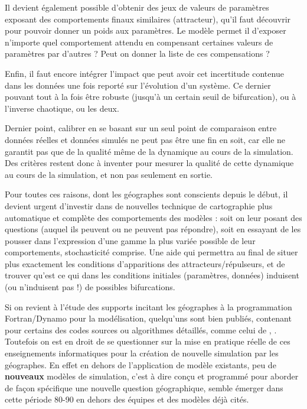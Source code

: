 Il devient également possible d'obtenir des jeux de valeurs de paramètres exposant des comportements finaux similaires (attracteur), qu'il faut découvrir pour pouvoir donner un poids aux paramètres. Le modèle permet il d'exposer n'importe quel comportement attendu en compensant certaines valeurs de paramètres par d'autres ? Peut on donner la liste de ces compensations ?

Enfin, il faut encore intégrer l'impact que peut avoir cet incertitude contenue dans les données une fois reporté sur l'évolution d'un système. Ce dernier pouvant tout à la fois être robuste (jusqu'à un certain seuil de bifurcation), ou à l'inverse chaotique, ou les deux.

Dernier point, calibrer en se basant sur un seul point de comparaison entre données réelles et données simulés ne peut pas être une fin en soit, car elle ne garantit pas que de la qualité même de la dynamique au cours de la simulation. Des critères restent donc à inventer pour mesurer la qualité de cette dynamique au cours de la simulation, et non pas seulement en sortie.

Pour toutes ces raisons, dont les géographes sont conscients depuis le début, il devient urgent d'investir dans de nouvelles technique de cartographie plus automatique et complète des comportements des modèles : soit on leur posant des questions (auquel ils peuvent ou ne peuvent pas répondre), soit en essayant de les pousser dans l'expression d'une gamme la plus variée possible de leur comportements, stochasticité comprise. Une aide qui permettra au final de situer plus exactement les conditions d'apparitions des attracteurs/répulseurs, et de trouver qu'est ce qui dans les conditions initiales (paramètres, données) induisent (ou n'induisent pas !) de possibles bifurcations.

Si on revient à l'étude des supports incitant les géographes à la programmation Fortran/Dynamo pour la modélisation, quelqu'uns sont bien publiés, contenant pour certains des codes sources ou algorithmes détaillés, comme celui de \textcite{Guermond1984}, \textcite{Dauphine1987}. Toutefois on est en droit de se questionner sur la mise en pratique réelle de ces enseignements informatiques pour la création de nouvelle simulation par les géographes. En effet en dehors de l'application de modèle existants, peu de \textbf{nouveaux} modèles de simulation, c'est à dire conçu et programmé pour aborder de façon spécifique une nouvelle question géographique, semble émerger dans cette période 80-90 en dehors des équipes et des modèles déjà cités.

